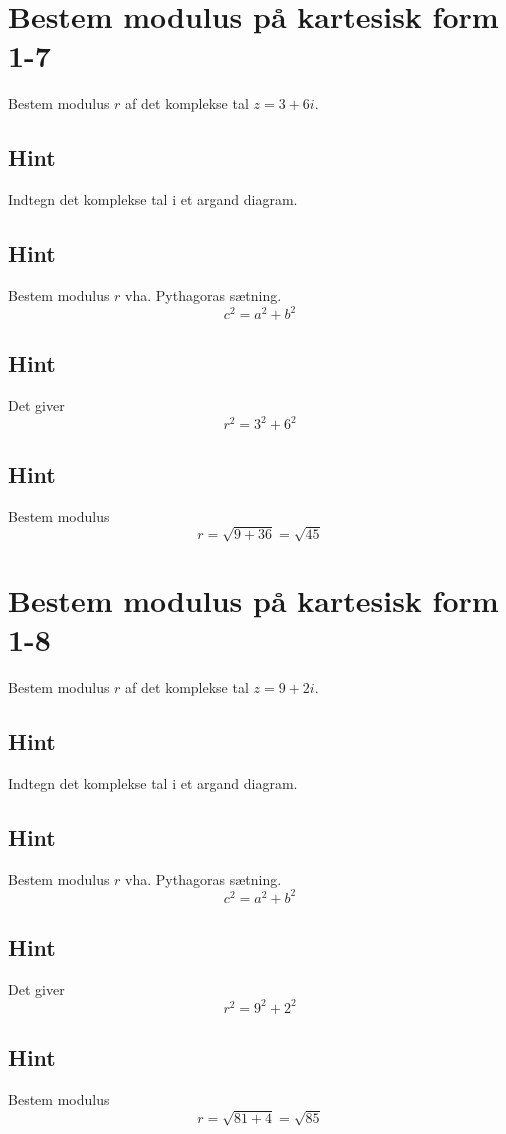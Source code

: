 \documentclass{article}
\newenvironment{exercise}[1]{\newpage\section{#1}}{}
\newcommand{\answerbox}[1]{\fbox{$#1$}}
\newcommand{\hint}{\subsection*{Hint}}
\begin{document}
\newpage

\begin{exercise}{Bestem modulus på kartesisk form 1-7}
	
	Bestem modulus $r$ af det komplekse tal $z=3+6i$.
	
	\answerbox{\sqrt{45} }
	
	
	\hint 
	
	Indtegn det komplekse tal i et argand diagram.
	
	
	\hint
	
	Bestem modulus $r$ vha. Pythagoras sætning.
	\[
	c^2 = a^2 + b^2
	\]
	
	\hint 
	
	Det giver
	\[
	r^2 = 3^2 + 6^2
	\]
	
	\hint
	
	Bestem modulus
	\[
	r  = \sqrt{9+36} = \sqrt{45} 
	\]
	
	
	
\end{exercise}


\newpage

\begin{exercise}{Bestem modulus på kartesisk form 1-8}
	
	Bestem modulus $r$ af det komplekse tal $z=9+2i$.
	
	\answerbox{\sqrt{85} }
	
	
	\hint 
	
	Indtegn det komplekse tal i et argand diagram.
	
	
	\hint
	
	Bestem modulus $r$ vha. Pythagoras sætning.
	\[
	c^2 = a^2 + b^2
	\]
	
	\hint 
	
	Det giver
	\[
	r^2 = 9^2 + 2^2
	\]
	
	\hint
	
	Bestem modulus
	\[
	r  = \sqrt{81+4} = \sqrt{85} 
	\]
	
	
	
\end{exercise}
\end{document}
